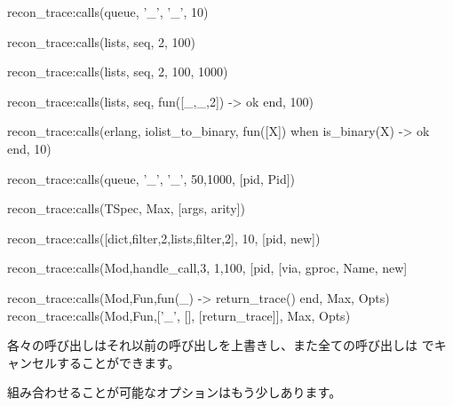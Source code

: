 \begin{VerbatimErl}
recon_trace:calls({queue, '_', '_'}, 10)

recon_trace:calls({lists, seq, 2}, 100)

recon_trace:calls({lists, seq, 2}, {100, 1000})

recon_trace:calls({lists, seq, fun([_,_,2]) -> ok end}, 100)

recon_trace:calls({erlang, iolist_to_binary,
                   fun([X]) when is_binary(X) -> ok end},
                  10)

recon_trace:calls({queue, '_', '_'}, {50,1000}, [{pid, Pid}])

recon_trace:calls(TSpec, Max, [{args, arity}])

recon_trace:calls([{dict,filter,2},{lists,filter,2}], 10, [{pid, new}])

recon_trace:calls({Mod,handle_call,3}, {1,100}, [{pid, [{via, gproc, Name}, new]}

recon_trace:calls({Mod,Fun,fun(_) -> return_trace() end}, Max, Opts)
recon_trace:calls({Mod,Fun,[{'_', [], [{return_trace}]}]}, Max, Opts)

\end{VerbatimErl}

各々の呼び出しはそれ以前の呼び出しを上書きし、また全ての呼び出しは  でキャンセルすることができます。

組み合わせることが可能なオプションはもう少しあります。



